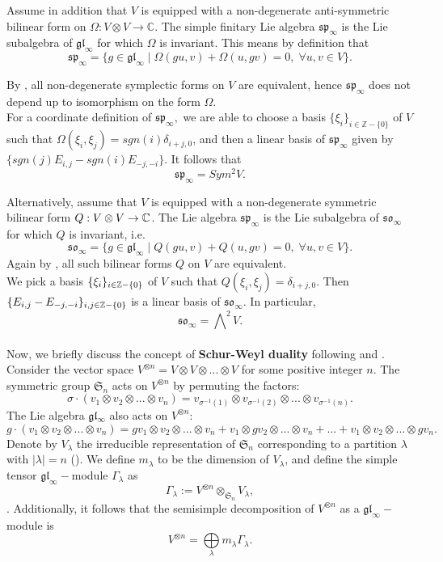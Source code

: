 \documentclass[main.tex]{subfiles}
\begin{document}
\bigskip


Assume in addition that $V$ is equipped with a non-degenerate anti-symmetric bilinear form on $\Omega:V\otimes V\to \mathbb{C}$. The simple finitary Lie algebra $\mathfrak{sp}_\infty$ is the Lie subalgebra of $\mathfrak{gl}_\infty$ for which $\Omega$ is invariant. This means by definition that
$$\mathfrak{sp}_\infty = \{ g\in\mathfrak{gl}_\infty \; | \; \Omega(gu, v) + \Omega(u, gv) = 0,\; \forall u,v\in V \}.$$

By \cite{Mackey}, all non-degenerate symplectic forms on $V$ are equivalent, hence $\mathfrak{sp}_\infty$ does not depend up to isomorphism on the form $\Omega.$\\

For a coordinate definition of $\mathfrak{sp}_\infty,$ we are able to choose a basis $\{\xi_i\}_{i\in\mathbb{Z}-\{0\}}$ of $V$ such that $\Omega(\xi_i,\xi_j) = sgn(i)\delta_{i+j,0}$, and then a linear basis of  $\mathfrak{sp}_\infty$ given by $\{sgn(j)E_{i,j} - sgn(i)E_{-j,-i}\}.$ It follows that 
$$\mathfrak{sp}_\infty = Sym^2V.$$


\bigskip
Alternatively, assume that $V$ is equipped with a non-degenerate symmetric bilinear form $Q:V\otimes V\to \mathbb{C}$. The Lie algebra $\mathfrak{sp}_\infty$ is the Lie subalgebra of $\mathfrak{so}_\infty$ for which $Q$ is invariant, i.e. 
$$
\mathfrak{so}_\infty=\{g\in \mathfrak{gl}_\infty\;|\; Q(gu,v)+Q(u,gv)=0, \;\forall u,v\in V\}.
$$
Again by \cite{Mackey}, all such bilinear forms $Q$ on $V$ are equivalent. \\

We pick a basis $\{\xi_i\}_{i\in \mathbb{Z}-\{0\}}$ of $V$ such that $Q(\xi_i, \xi_j)=\delta_{i+j, 0}.$ Then $\{E_{i,j}-E_{-j,-i}\}_{i,j\in \mathbb{Z}-\{0\}}$ is a linear basis of $\mathfrak{so}_\infty.$ In particular,
$$\mathfrak{so}_\infty = \bigwedge\nolimits^2 V.$$\\

\bigskip
Now, we briefly discuss the concept of \textbf{Schur-Weyl duality} following \cite{wikipediaschurweyl} and \cite{fulton1991representation}. Consider the vector space $V^{\otimes n} = V\otimes V\otimes ...\otimes V$ for some positive integer $n$. The symmetric group $\mathfrak{S}_n$ acts on $V^{\otimes n}$ by permuting the factors:
$$
\sigma\cdot(v_1\otimes v_2\otimes...\otimes v_n) = v_{\sigma^{-1}(1)}\otimes v_{\sigma^{-1}(2)}\otimes...\otimes v_{\sigma^{-1}(n)}.
$$
The Lie algebra $\mathfrak{gl_\infty}$ also acts on $V^{\otimes n}$:
$$
g\cdot(v_1\otimes v_2\otimes...\otimes v_n) = gv_1\otimes v_2\otimes...\otimes v_n + v_1\otimes gv_2\otimes...\otimes v_n + ... + v_1\otimes v_2\otimes...\otimes gv_n.
$$
Denote by $V_{\lambda}$ the irreducible representation of $\mathfrak{S}_n$ corresponding to a partition $\lambda$ with $|\lambda|=n$ (\cite{fulton1991representation}). We define $m_\lambda$ to be the dimension of $V_{\lambda}$, and define the simple tensor $\mathfrak{gl}_\infty-$module $\Gamma_\lambda$ as
$$\Gamma_\lambda := V^{\otimes n}\otimes_{\mathfrak{S}_n}V_\lambda,$$ 
. Additionally, it follows that the semisimple decomposition of $V^{\otimes n}$ as a $\mathfrak{gl}_\infty-$module is
$$V^{\otimes n} = \bigoplus\limits_{\lambda}m_\lambda\Gamma_\lambda.$$
\end{document}
